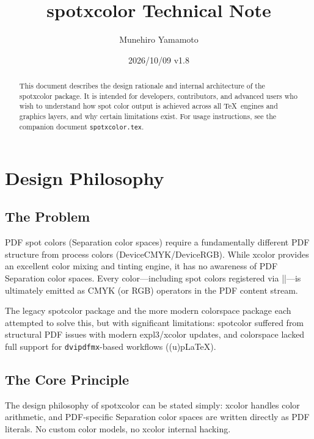 \documentclass[luatex]{article}
\title{\textsf{spotxcolor} Technical Note}
\author{Munehiro Yamamoto}
\date{2026/10/09 v1.8}
\newcommand\pkg[1]{\textsf{#1}}
\begin{document}
\maketitle

\begin{abstract}
This document describes the design rationale and internal architecture of the \pkg{spotxcolor} package.
It is intended for developers, contributors, and advanced users who wish to understand how spot color output is achieved across all \TeX\ engines and graphics layers, and why certain limitations exist.
For usage instructions, see the companion document \texttt{spotxcolor.tex}.
\end{abstract}

\tableofcontents

\section{Design Philosophy}

\subsection{The Problem}

PDF spot colors (Separation color spaces) require a fundamentally different PDF structure from process colors (DeviceCMYK/DeviceRGB).
While \pkg{xcolor} provides an excellent color mixing and tinting engine, it has no awareness of PDF Separation color spaces.
Every color---including spot colors registered via ||---is ultimately emitted as CMYK (or RGB) operators in the PDF content stream.

The legacy \pkg{spotcolor} package and the more modern \pkg{colorspace} package each attempted to solve this, but with significant limitations:
\pkg{spotcolor} suffered from structural PDF issues with modern \pkg{expl3}/\pkg{xcolor} updates,
and \pkg{colorspace} lacked full support for \texttt{dvipdfmx}-based workflows ((u)p\LaTeX).

\subsection{The Core Principle}

The design philosophy of \pkg{spotxcolor} can be stated simply:
\pkg{xcolor} handles color arithmetic,
and PDF-specific Separation color spaces are written directly as PDF literals.
No custom color models, no \pkg{xcolor} internal hacking.
\end{document}
